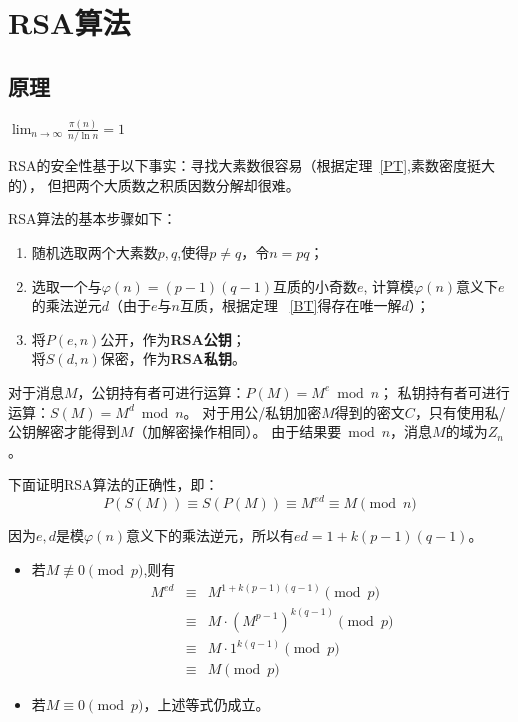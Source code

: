\section{RSA算法}
\subsection{原理}
\begin{theorem}[素数定理]\label{PT}
	$\displaystyle \lim_{n\rightarrow\infty}\frac{\pi(n)}{n/\ln n}=1$
\end{theorem}
RSA的安全性基于以下事实：寻找大素数很容易（根据定理~\ref{PT},素数密度挺大的），
但把两个大质数之积质因数分解却很难。

RSA算法的基本步骤如下：
\begin{enumerate}
	\item 随机选取两个大素数$p,q$,使得$p\neq q$，令$n=pq$；
	\item 选取一个与$\varphi(n)=(p-1)(q-1)$互质的小奇数$e$,
	      计算模$\varphi(n)$意义下$e$的乘法逆元$d$（由于$e$与$n$互质，根据定理
	      ~\ref{BT}得存在唯一解$d$）；
	\item 将$P(e,n)$公开，作为{\bfseries RSA公钥}；\\
	      将$S(d,n)$保密，作为{\bfseries RSA私钥}。
\end{enumerate}

对于消息$M$，公钥持有者可进行运算：$P(M)=M^e \bmod n$；
私钥持有者可进行运算：$S(M)=M^d \bmod n$。
对于用公/私钥加密$M$得到的密文$C$，只有使用私/公钥解密才能得到$M$（加解密操作相同）。
由于结果要$\bmod n$，消息$M$的域为$Z_n$。

下面证明RSA算法的正确性，即：
\begin{displaymath}
	P(S(M))\equiv S(P(M))\equiv M^{ed}\equiv M \pmod{n}
\end{displaymath}

因为$e,d$是模$\varphi(n)$意义下的乘法逆元，所以有$ed=1+k(p-1)(q-1)$。

\begin{itemize}
	\item 若$M\not\equiv 0 \pmod{p}$,则有
	      \begin{eqnarray*}
		      M^{ed}&\equiv& M^{1+k(p-1)(q-1)} \pmod{p}\\
		      &\equiv& M\cdot (M^{p-1})^{k(q-1)} \pmod{p}\\
		      &\equiv& M\cdot 1^{k(q-1)} \pmod{p}\\
		      &\equiv& M \pmod{p}
	      \end{eqnarray*}
	\item 若$M\equiv 0 \pmod{p}$，上述等式仍成立。
\end{itemize}

